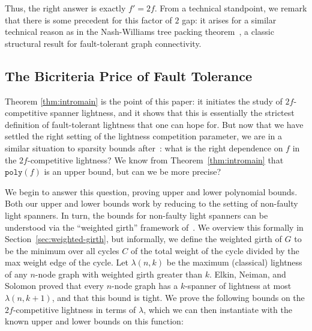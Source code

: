 \documentclass{article}
\theoremstyle{plain}
\theoremstyle{definition}
\begin{document}
Thus, the right answer is exactly $f'=2f$.
From a technical standpoint, we remark that there is some precedent for this factor of $2$ gap: it arises for a similar technical reason as in the Nash-Williams tree packing theorem~\cite{NashWilliams}, a classic structural result for fault-tolerant graph connectivity.

\subsection{The Bicriteria Price of Fault Tolerance}

Theorem \ref{thm:intromain} is the point of this paper: it initiates the study of $2f$-competitive spanner lightness, and it shows that this is essentially the strictest definition of fault-tolerant lightness that one can hope for.  But now that we have settled the right setting of the lightness competition parameter, we are in a similar situation to sparsity bounds after~\cite{CLPR10}: what is the right dependence on $f$ in the $2f$-competitive lightness?  We know from Theorem~\ref{thm:intromain} that $\texttt{poly}(f)$ is an upper bound, but can we be more precise? 

We begin to answer this question, proving upper and lower polynomial bounds.  Both our upper and lower bounds work by reducing to the setting of non-faulty light spanners.
In turn, the bounds for non-faulty light spanners can be understood via the ``weighted girth'' framework of~\cite{ENS14}.
We overview this formally in Section~\ref{sec:weighted-girth}, but informally, we define the weighted girth of $G$ to be the minimum over all cycles $C$ of the total weight of the cycle divided by the max weight edge of the cycle.
Let $\lambda(n,k)$ be the maximum (classical) lightness of any $n$-node graph with weighted girth greater than $k$.
Elkin, Neiman, and Solomon \cite{ENS14} proved that every $n$-node graph has a $k$-spanner of lightness at most $\lambda(n, k+1)$, and that this bound is tight.
We prove the following bounds on the $2f$-competitive lightness in terms of $\lambda$, which we can then instantiate with the known upper and lower bounds on this function:
\end{document}

